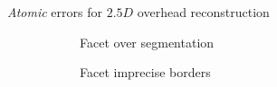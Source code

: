 \documentclass[export]{beamer}
\begin{document}
\begin{frame}[plain]{\emph{Atomic} errors for $2.5D$ overhead reconstruction}
{\begin{figure}
\begin{center}
\begin{subfigure}{.28\textwidth}
                                \caption{\label{fig::fac_over} Facet over segmentation}
                            \end{subfigure}
                            \hspace{10pt}
                            \begin{subfigure}{.28\textwidth}
                                \caption{\label{fig::fac_footprint} Facet imprecise borders}
                            \end{subfigure}
                            \hspace{10pt}
                            \begin{subfigure}{.28\textwidth}

\end{subfigure}
\end{center}
\end{figure}}
\end{frame}
\end{document}
